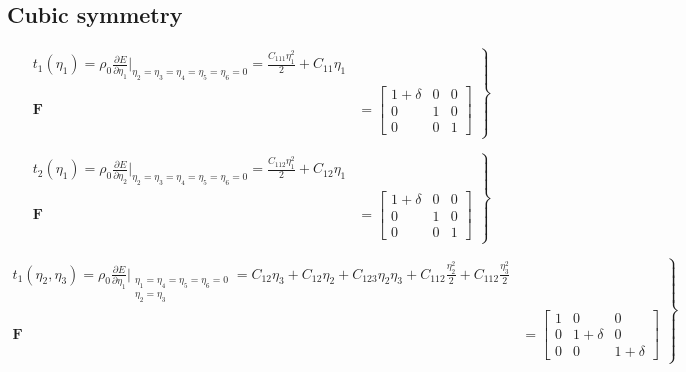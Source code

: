 \documentclass[showpacs,aps,floatfix,prb,reprint,superscriptaddress,onecolumn]{revtex4-1}
\begin{document}
\subsection{Cubic symmetry}


\begin{equation}
\label{eqn:SM-hexs1}
  \left.\begin{aligned}
        t_{1} \left(\eta_{1}\right) = \rho_{0} \frac{\partial E}{\partial \eta_{1}}\Bigr|_{\eta_2=\eta_3=\eta_4=\eta_5=\eta_6=0} = \frac{C_{111}\eta_{1}^2}{2} + C_{11}\eta_{1}\\
        \bm{F}&=\begin{bmatrix} 1+\delta & 0 & 0 \\ 0 & 1 & 0 \\ 0 & 0 & 1 \end{bmatrix}
       \end{aligned}
			\right\}
\end{equation}


\begin{equation}
\label{eqn:SM-hexs2}
  \left.\begin{aligned}
        t_{2} \left(\eta_{1}\right) = \rho_{0} \frac{\partial E}{\partial \eta_{2}}\Bigr|_{\eta_2=\eta_3=\eta_4=\eta_5=\eta_6=0} = \frac{C_{112}\eta_{1}^2}{2} + C_{12}\eta_{1}\\
        \bm{F}&=\begin{bmatrix} 1+\delta & 0 & 0 \\ 0 & 1 & 0 \\ 0 & 0 & 1 \end{bmatrix}
       \end{aligned}
			\right\}
\end{equation}

\begin{equation}
\label{eqn:SM-hexs3}
  \left.\begin{aligned}
        t_{1} \left(\eta_{2}, \eta_{3}\right) = \rho_{0} \frac{\partial E}{\partial \eta_{1}}\Bigr|_{\substack{\eta_1=\eta_4=\eta_5=\eta_6=0 \\ \eta_{2}=\eta_{3}}} = C_{12}\eta_{3} + C_{12}\eta_{2} + C_{123}\eta_{2}\eta_{3} + C_{112}\frac{\eta_{2}^{2}}{2} + C_{112}\frac{\eta_{3}^{2}}{2} \\
        \bm{F}&=\begin{bmatrix} 1 & 0 & 0 \\ 0 & 1+\delta & 0 \\ 0 & 0 & 1+\delta \end{bmatrix}
       \end{aligned}
			\right\}
\end{equation}
\end{document}
